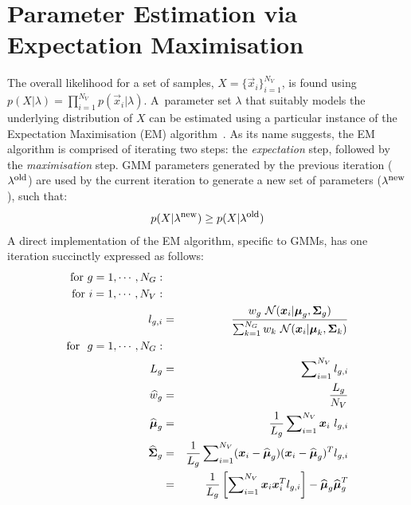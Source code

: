 \section{Parameter Estimation via Expectation Maximisation}
\label{sec:parameter_estimation}

\noindent
The overall likelihood for a set of samples, $X=\{\Vec{x}_i\}_{i=1}^{N_V}$,
is found using $p(X | \lambda) = \prod\nolimits_{i=1}^{N_V} p(\Vec{x}_i | \lambda)$.
A~parameter set $\lambda$ that suitably models the underlying distribution of $X$ can be estimated using a particular instance of the Expectation Maximisation (EM) algorithm~\cite{Dempster77, McLachlan-2008, Moon96, Redner84}.
As its name suggests, the EM algorithm is comprised of iterating two steps: the {\it expectation} step, followed by the {\it maximisation} step.
GMM parameters generated by the previous iteration ($\lambda^{\mbox{\footnotesize old}}$) are used
by the current iteration to generate a new set of parameters ($\lambda^{\mbox{\footnotesize new}}$), such that:
%
\begin{eqnarray}
	p(X|\lambda^{\mbox{\footnotesize new}}) \geq p(X|\lambda^{\mbox{\footnotesize old}})
\end{eqnarray}
%
A direct implementation of the EM algorithm, specific to GMMs, has one iteration succinctly expressed as follows:
%
\begin{eqnarray}
  \mbox{for} ~g=1, \cdots, N_G: \nonumber \\
  \mbox{for} ~i=1, \cdots, N_V: \nonumber \\
  l_{g,i} & = & \frac{w_g ~ {{\mathcal{N}}}( {\boldsymbol{x}}_i | {\boldsymbol{\mu}}_g, {\boldsymbol{\Sigma}}_g )}
  {\sum\nolimits_{k=1}^{N_G} w_k ~ {{\mathcal{N}}}( {\boldsymbol{x}}_i | {\boldsymbol{\mu}}_k, {\boldsymbol{\Sigma}}_k )} \label{eqn:aposteriori}\\
\mbox{for} ~~ g  =  1, \cdots, N_G:  \nonumber \\
	L_g & = & \sum\nolimits_{i=1}^{N_V} l_{g,i} \label{eqn:L_k} \\
	\widehat{w}_g & = & \frac{L_g}{N_V} \label{eqn:m_k} \\
	\widehat{{\boldsymbol{\mu}}}_g & = & \frac{1}{L_g} \sum\nolimits_{i=1}^{N_V} {\boldsymbol{x}}_i ~ l_{g,i}  \label{eqn:em_mean} \\
	\widehat{{\boldsymbol{\Sigma}}}_g & = & \frac{1}{L_g} \sum\nolimits_{i=1}^{N_V} ({\boldsymbol{x}}_i - \widehat{{\boldsymbol{\mu}}}_g)({\boldsymbol{x}}_i - \widehat{{\boldsymbol{\mu}}}_g)^T l_{g,i} \label{eqn:em_covA} \\
	& = &  \frac{1}{L_g} \left[ \sum\nolimits_{i=1}^{N_V} {\boldsymbol{x}}_i {\boldsymbol{x}}_i^T l_{g,i} \right] - \widehat{{\boldsymbol{\mu}}}_g \widehat{{\boldsymbol{\mu}}}_g^T \label{eqn:em_covB}
\end{eqnarray}

